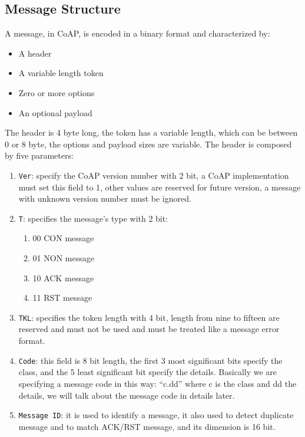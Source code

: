 	\subsection{Message Structure}
	A message, in CoAP, is encoded in a binary format and characterized by:\newline
	\begin{itemize}
		\item A header
		\item A variable length token
		\item Zero or more options
		\item An optional payload
	\end{itemize}
	The header is 4 byte long, the token has a variable length, which can be between 0 or 8 byte, the options and payload sizes are variable.\newline
	The header is composed by five parameters:\newline
	\begin{enumerate}
		\item \texttt{Ver}: specify the CoAP version number with 2 bit, a CoAP implementation must set this field to 1, other values are reserved for future version, a message with unknown version number must be ignored.
		\item \texttt{T}: specifies the message's type with 2 bit:
		\begin{enumerate}
			\item 00 CON message
			\item 01 NON message
			\item 10 ACK message
			\item 11 RST message
		\end{enumerate}
		\item \texttt{TKL}: specifies the token length with 4 bit, length from nine to fifteen are reserved and must not be used and must be treated like a message error format.
		\item \texttt{Code}: this field is 8 bit length, the first 3 most significant bits specify the class, and the 5 least significant bit specify the details.
		Basically we are specifying a message code in this way: “c.dd” where c is the class and dd the details, we will talk about the message code in details later.
		\item \texttt{Message ID}: it is used to identify a message, it also used to detect duplicate message and to match ACK/RST message, and its dimension is 16 bit.
	\end{enumerate}
	
